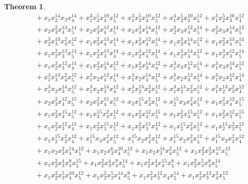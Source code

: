 \documentclass[reqno]{amsart}
\theoremstyle{plain}
\newtheorem{thm}{Theorem}[section]
\theoremstyle{definition}
\theoremstyle{plain}
\theoremstyle{definition}
\numberwithin{equation}{section}
\begin{document}
\begin{thm}
\begin{align*}
&\quad + x_1x_2^{14}x_3x_4^{14} + x_1^{3}x_3^{5}x_4^{10}x_5^{12} + x_1^{3}x_2^{5}x_4^{10}x_5^{12} + x_1^{3}x_2^{5}x_3^{10}x_5^{12} + x_1^{3}x_2^{5}x_3^{10}x_4^{12}\\ 
&\quad + x_2x_3^{2}x_4^{13}x_5^{14} + x_2x_3^{3}x_4^{12}x_5^{14} + x_2x_3^{3}x_4^{14}x_5^{12} + x_2^{3}x_3x_4^{12}x_5^{14} + x_2^{3}x_3x_4^{14}x_5^{12}\\ 
&\quad + x_2^{3}x_3^{13}x_4^{2}x_5^{12} + x_1x_3^{2}x_4^{13}x_5^{14} + x_1x_3^{3}x_4^{12}x_5^{14} + x_1x_3^{3}x_4^{14}x_5^{12} + x_1x_2^{2}x_4^{13}x_5^{14}\\ 
&\quad + x_1x_2^{2}x_3^{13}x_5^{14} + x_1x_2^{2}x_3^{13}x_4^{14} + x_1x_2^{3}x_4^{12}x_5^{14} + x_1x_2^{3}x_4^{14}x_5^{12} + x_1x_2^{3}x_3^{12}x_5^{14}\\ 
&\quad + x_1x_2^{3}x_3^{12}x_4^{14} + x_1x_2^{3}x_3^{14}x_5^{12} + x_1x_2^{3}x_3^{14}x_4^{12} + x_1^{3}x_3x_4^{12}x_5^{14} + x_1^{3}x_3x_4^{14}x_5^{12}\\ 
&\quad + x_1^{3}x_3^{13}x_4^{2}x_5^{12} + x_1^{3}x_2x_4^{12}x_5^{14} + x_1^{3}x_2x_4^{14}x_5^{12} + x_1^{3}x_2x_3^{12}x_5^{14} + x_1^{3}x_2x_3^{12}x_4^{14}\\ 
&\quad + x_1^{3}x_2x_3^{14}x_5^{12} + x_1^{3}x_2x_3^{14}x_4^{12} + x_1^{3}x_2^{13}x_4^{2}x_5^{12} + x_1^{3}x_2^{13}x_3^{2}x_5^{12} + x_1^{3}x_2^{13}x_3^{2}x_4^{12}\\ 
&\quad + x_2x_3^{2}x_4^{12}x_5^{15} + x_2x_3^{2}x_4^{15}x_5^{12} + x_2x_3^{15}x_4^{2}x_5^{12} + x_2^{15}x_3x_4^{2}x_5^{12} + x_1x_3^{2}x_4^{12}x_5^{15}\\ 
&\quad + x_1x_3^{2}x_4^{15}x_5^{12} + x_1x_3^{15}x_4^{2}x_5^{12} + x_1x_2^{2}x_4^{12}x_5^{15} + x_1x_2^{2}x_4^{15}x_5^{12} + x_1x_2^{2}x_3^{12}x_5^{15}\\ 
&\quad + x_1x_2^{2}x_3^{12}x_4^{15} + x_1x_2^{2}x_3^{15}x_5^{12} + x_1x_2^{2}x_3^{15}x_4^{12} + x_1x_2^{15}x_4^{2}x_5^{12} + x_1x_2^{15}x_3^{2}x_5^{12}\\ 
&\quad + x_1x_2^{15}x_3^{2}x_4^{12} + x_1^{15}x_3x_4^{2}x_5^{12} + x_1^{15}x_2x_4^{2}x_5^{12} + x_1^{15}x_2x_3^{2}x_5^{12} + x_1^{15}x_2x_3^{2}x_4^{12}\\ 
&\quad + x_1x_2x_3^{2}x_4^{14}x_5^{12} + x_1x_2x_3^{6}x_4^{10}x_5^{12} + x_1x_2x_3^{14}x_4^{2}x_5^{12} + x_1x_2^{2}x_3^{3}x_4^{12}x_5^{12}\\ 
&\quad + x_1x_2^{2}x_3^{4}x_4^{8}x_5^{15} + x_1x_2^{2}x_3^{4}x_4^{9}x_5^{14} + x_1x_2^{2}x_3^{4}x_4^{15}x_5^{8} + x_1x_2^{2}x_3^{5}x_4^{8}x_5^{14}\\ 
&\quad + x_1x_2^{2}x_3^{5}x_4^{10}x_5^{12} + x_1x_2^{2}x_3^{5}x_4^{14}x_5^{8} + x_1x_2^{2}x_3^{12}x_4x_5^{14} + x_1x_2^{2}x_3^{13}x_4^{2}x_5^{12}\\ 

\end{align*}
\end{thm}
\end{document}
